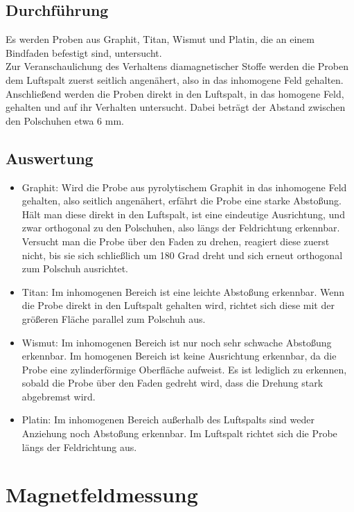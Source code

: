 \documentclass[a4paper,twoside,12pt,DIV=13,BCOR=5mm,numbers=noenddot,cleardoublepage=empty]{scrbook}
\begin{document}
        \subsection{Durchf\"uhrung}
        Es werden Proben aus Graphit, Titan, Wismut und Platin, die an einem Bindfaden befestigt sind, untersucht.
        \\
        Zur Veranschaulichung des Verhaltens diamagnetischer Stoffe werden die Proben dem Luftspalt zuerst seitlich angen\"ahert, also in das inhomogene Feld gehalten. Anschlie\ss{}end werden die Proben direkt in den Luftspalt, in das homogene Feld, gehalten und auf ihr Verhalten untersucht. 
        Dabei betr\"agt der Abstand zwischen den Polschuhen etwa 6 mm.
        \pagebreak
        \subsection{Auswertung}
        \begin{itemize}
            \item Graphit: Wird die Probe aus pyrolytischem Graphit in das inhomogene Feld gehalten, also seitlich angen\"ahert, erf\"ahrt die Probe eine starke Absto\ss{}ung. H\"alt man diese direkt in den Luftspalt, ist eine eindeutige Ausrichtung, und zwar orthogonal zu den Polschuhen, also l\"angs der Feldrichtung erkennbar. Versucht man die Probe \"uber den Faden zu drehen, reagiert diese zuerst nicht, bis sie sich schlie\ss{}lich um 180 Grad dreht und sich erneut orthogonal zum Polschuh ausrichtet.
            \item Titan: Im inhomogenen Bereich ist eine leichte Absto\ss{}ung erkennbar. Wenn die Probe direkt in den Luftspalt gehalten wird, richtet sich diese mit der gr\"o\ss{}eren Fl\"ache parallel zum Polschuh aus.
            \item Wismut: Im inhomogenen Bereich ist nur noch sehr schwache Absto\ss{}ung erkennbar. Im homogenen Bereich ist keine Ausrichtung erkennbar, da die Probe eine zylinderf\"ormige Oberfl\"ache aufweist. Es ist lediglich zu erkennen, sobald die Probe \"uber den Faden gedreht wird, dass die Drehung stark abgebremst wird.
            \item Platin: Im inhomogenen Bereich au\ss{}erhalb des Luftspalts sind weder Anziehung noch Absto\ss{}ung erkennbar. Im Luftspalt richtet sich die Probe l\"angs der Feldrichtung aus.            
        \end{itemize}
    \section{Magnetfeldmessung}
\end{document}
